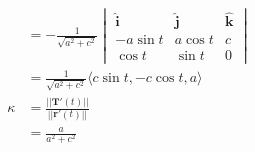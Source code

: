 \documentclass{article}
\begin{document}
\begin{align*}
                                                     & = -\frac{1}{\sqrt{a^2 + c^2}} \begin{vmatrix}
                                                                                       \hat{\mathbf{i}} & \hat{\mathbf{j}} & \hat{\mathbf{k}} \\
                                                                                       -a \sin t        & a \cos t         & c                \\
                                                                                       \cos t           & \sin t           & 0
                                                                                     \end{vmatrix} \\
                                                     & = \frac{1}{\sqrt{a^2 + c^2}} \langle c \sin t, -c \cos t, a \rangle                                                      \\
  \kappa                                             & = \frac{||\mathbf{T}'(t)||}{||\mathbf{r}'(t)||}                                                                          \\
                                                     & = \frac{a}{a^2 + c^2}
\end{align*}

\setcounter{subsubsection}{4}
\subsubsection{}
\end{document}
